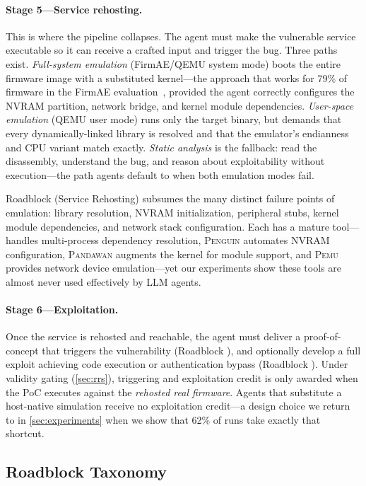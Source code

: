 \paragraph{Stage 5---Service rehosting.} This is where the pipeline collapses. The agent must make the vulnerable service executable so it can receive a crafted input and trigger the bug. Three paths exist. \emph{Full-system emulation} (FirmAE/QEMU system mode) boots the entire firmware image with a substituted kernel---the approach that works for 79\% of firmware in the FirmAE evaluation~\cite{firmae}, provided the agent correctly configures the NVRAM partition, network bridge, and kernel module dependencies. \emph{User-space emulation} (QEMU user mode) runs only the target binary, but demands that every dynamically-linked library is resolved and that the emulator's endianness and CPU variant match exactly. \emph{Static analysis} is the fallback: read the disassembly, understand the bug, and reason about exploitability without execution---the path agents default to when both emulation modes fail.

Roadblock  (Service Rehosting) subsumes the many distinct failure points of emulation: library resolution, NVRAM initialization, peripheral stubs, kernel module dependencies, and network stack configuration. Each has a mature tool---\firmwell handles multi-process dependency resolution, \textsc{Penguin} automates NVRAM configuration, \textsc{Pandawan} augments the kernel for module support, and \textsc{Pemu} provides network device emulation---yet our experiments show these tools are almost never used effectively by LLM agents.

\paragraph{Stage 6---Exploitation.} Once the service is rehosted and reachable, the agent must deliver a proof-of-concept that triggers the vulnerability (Roadblock ), and optionally develop a full exploit achieving code execution or authentication bypass (Roadblock ). Under validity gating (\cref{sec:rrs}), triggering and exploitation credit is only awarded when the PoC executes against the \emph{rehosted real firmware}. Agents that substitute a host-native simulation receive no exploitation credit---a design choice we return to in \cref{sec:experiments} when we show that 62\% of runs take exactly that shortcut.

\subsection{Roadblock Taxonomy}
\label{sec:roadblocks}

